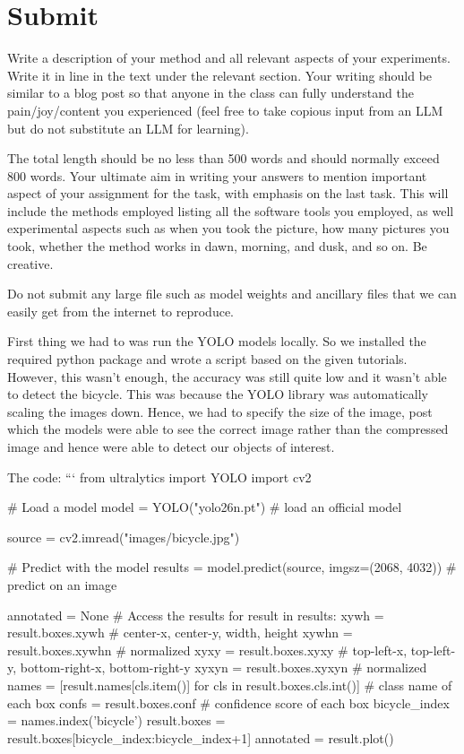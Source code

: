 \section{Submit}

Write a description of your method and all relevant aspects of your
experiments. Write it in line in the text under the relevant section.  Your writing should be similar to  a blog post so that anyone in the class can fully understand the pain/joy/content you experienced (feel free to take copious input from an LLM but do not substitute an LLM for learning).

The total length should be no less than 500 words and
should normally exceed 800 words.  Your ultimate aim in writing your answers
to mention important aspect of your assignment for the task, with
emphasis on the last task.  This will include the methods employed
listing all the software tools you employed, as well experimental
aspects such as when you took the picture, how many pictures 
you took, whether the method works in dawn, morning, and dusk, and so
on. Be creative.  

Do not submit any large file such as
model weights and ancillary files that we can easily get from the
internet to reproduce.

First thing we had to was run the YOLO models locally. So we installed the required python package and wrote a script based on the given tutorials.
However, this wasn't enough, the accuracy was still quite low and it wasn't able to detect the bicycle.
This was because the YOLO library was automatically scaling the images down. Hence, we had to specify the size of the image, post which the models were able to see the correct image rather than the compressed image and hence were able to detect our objects of interest.

The code:
```
from ultralytics import YOLO
import cv2

# Load a model
model = YOLO("yolo26n.pt")  # load an official model

source = cv2.imread("images/bicycle.jpg")

# Predict with the model
results = model.predict(source, imgsz=(2068, 4032))  # predict on an image

annotated = None
# Access the results
for result in results:
    xywh = result.boxes.xywh  # center-x, center-y, width, height
    xywhn = result.boxes.xywhn  # normalized
    xyxy = result.boxes.xyxy  # top-left-x, top-left-y, bottom-right-x, bottom-right-y
    xyxyn = result.boxes.xyxyn  # normalized
    names = [result.names[cls.item()] for cls in result.boxes.cls.int()]  # class name of each box
    confs = result.boxes.conf  # confidence score of each box
    bicycle_index = names.index('bicycle')
    result.boxes = result.boxes[bicycle_index:bicycle_index+1]
    annotated = result.plot()

